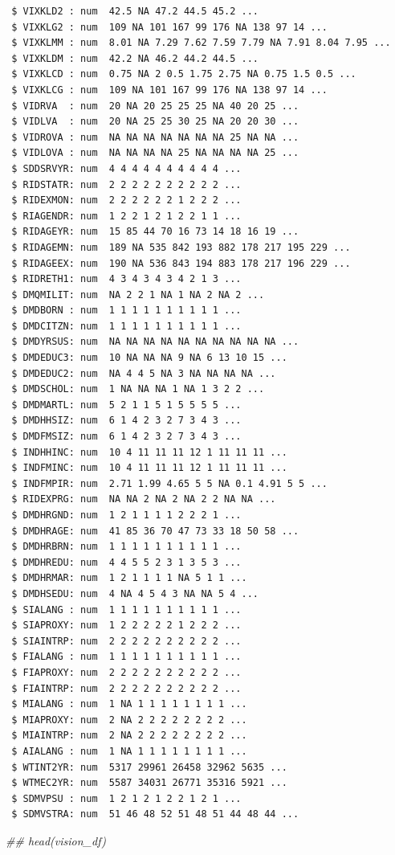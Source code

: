 \documentclass[
  12pt,
]{article}
\newenvironment{Shaded}{\begin{snugshade}}{\end{snugshade}}
\newcommand{\DocumentationTok}[1]{\textcolor[rgb]{0.37,0.37,0.37}{\textit{#1}}}
\begin{document}
\begin{verbatim}
 $ VIXKLD2 : num  42.5 NA 47.2 44.5 45.2 ...
 $ VIXKLG2 : num  109 NA 101 167 99 176 NA 138 97 14 ...
 $ VIXKLMM : num  8.01 NA 7.29 7.62 7.59 7.79 NA 7.91 8.04 7.95 ...
 $ VIXKLDM : num  42.2 NA 46.2 44.2 44.5 ...
 $ VIXKLCD : num  0.75 NA 2 0.5 1.75 2.75 NA 0.75 1.5 0.5 ...
 $ VIXKLCG : num  109 NA 101 167 99 176 NA 138 97 14 ...
 $ VIDRVA  : num  20 NA 20 25 25 25 NA 40 20 25 ...
 $ VIDLVA  : num  20 NA 25 25 30 25 NA 20 20 30 ...
 $ VIDROVA : num  NA NA NA NA NA NA NA 25 NA NA ...
 $ VIDLOVA : num  NA NA NA NA 25 NA NA NA NA 25 ...
 $ SDDSRVYR: num  4 4 4 4 4 4 4 4 4 4 ...
 $ RIDSTATR: num  2 2 2 2 2 2 2 2 2 2 ...
 $ RIDEXMON: num  2 2 2 2 2 2 1 2 2 2 ...
 $ RIAGENDR: num  1 2 2 1 2 1 2 2 1 1 ...
 $ RIDAGEYR: num  15 85 44 70 16 73 14 18 16 19 ...
 $ RIDAGEMN: num  189 NA 535 842 193 882 178 217 195 229 ...
 $ RIDAGEEX: num  190 NA 536 843 194 883 178 217 196 229 ...
 $ RIDRETH1: num  4 3 4 3 4 3 4 2 1 3 ...
 $ DMQMILIT: num  NA 2 2 1 NA 1 NA 2 NA 2 ...
 $ DMDBORN : num  1 1 1 1 1 1 1 1 1 1 ...
 $ DMDCITZN: num  1 1 1 1 1 1 1 1 1 1 ...
 $ DMDYRSUS: num  NA NA NA NA NA NA NA NA NA NA ...
 $ DMDEDUC3: num  10 NA NA NA 9 NA 6 13 10 15 ...
 $ DMDEDUC2: num  NA 4 4 5 NA 3 NA NA NA NA ...
 $ DMDSCHOL: num  1 NA NA NA 1 NA 1 3 2 2 ...
 $ DMDMARTL: num  5 2 1 1 5 1 5 5 5 5 ...
 $ DMDHHSIZ: num  6 1 4 2 3 2 7 3 4 3 ...
 $ DMDFMSIZ: num  6 1 4 2 3 2 7 3 4 3 ...
 $ INDHHINC: num  10 4 11 11 11 12 1 11 11 11 ...
 $ INDFMINC: num  10 4 11 11 11 12 1 11 11 11 ...
 $ INDFMPIR: num  2.71 1.99 4.65 5 5 NA 0.1 4.91 5 5 ...
 $ RIDEXPRG: num  NA NA 2 NA 2 NA 2 2 NA NA ...
 $ DMDHRGND: num  1 2 1 1 1 1 2 2 2 1 ...
 $ DMDHRAGE: num  41 85 36 70 47 73 33 18 50 58 ...
 $ DMDHRBRN: num  1 1 1 1 1 1 1 1 1 1 ...
 $ DMDHREDU: num  4 4 5 5 2 3 1 3 5 3 ...
 $ DMDHRMAR: num  1 2 1 1 1 1 NA 5 1 1 ...
 $ DMDHSEDU: num  4 NA 4 5 4 3 NA NA 5 4 ...
 $ SIALANG : num  1 1 1 1 1 1 1 1 1 1 ...
 $ SIAPROXY: num  1 2 2 2 2 2 1 2 2 2 ...
 $ SIAINTRP: num  2 2 2 2 2 2 2 2 2 2 ...
 $ FIALANG : num  1 1 1 1 1 1 1 1 1 1 ...
 $ FIAPROXY: num  2 2 2 2 2 2 2 2 2 2 ...
 $ FIAINTRP: num  2 2 2 2 2 2 2 2 2 2 ...
 $ MIALANG : num  1 NA 1 1 1 1 1 1 1 1 ...
 $ MIAPROXY: num  2 NA 2 2 2 2 2 2 2 2 ...
 $ MIAINTRP: num  2 NA 2 2 2 2 2 2 2 2 ...
 $ AIALANG : num  1 NA 1 1 1 1 1 1 1 1 ...
 $ WTINT2YR: num  5317 29961 26458 32962 5635 ...
 $ WTMEC2YR: num  5587 34031 26771 35316 5921 ...
 $ SDMVPSU : num  1 2 1 2 1 2 2 1 2 1 ...
 $ SDMVSTRA: num  51 46 48 52 51 48 51 44 48 44 ...
\end{verbatim}

\begin{Shaded}
\begin{Highlighting}[]
\DocumentationTok{\#\# head(vision\_df)}
\end{Highlighting}
\end{Shaded}
\end{document}
